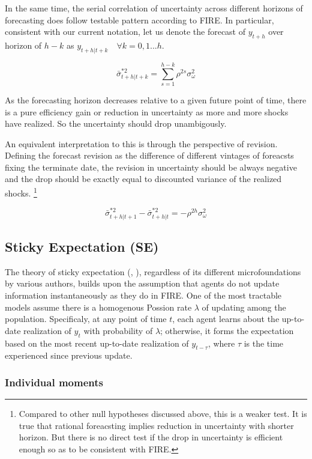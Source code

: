 \documentclass[]{article}
\begin{document}
In the same time, the serial correlation of uncertainty across different horizons of forecasting does follow testable pattern according to FIRE. In particular, consistent with our current notation, let us denote the forecast of $y_{t+h}$ over horizon of $h-k$ as $y_{t+h|t+k} \quad \forall k =0,1...h$. 

$$\bar \sigma^{*2}_{t+h|t+k} = \sum^{h-k}_{s=1}\rho^{2s} \sigma^2_{\omega}$$

As the forecasting horizon decreases relative to a given future point of time, there is a pure efficiency gain or reduction in uncertainty as more and more shocks have realized. So the uncertainty should drop unambigously. 

An equivalent interpretation to this is through the perspective of revision. Defining the forecast revision as the difference of different vintages of foreacsts fixing the terminate date, the revision in uncertainty should be always negative and the drop should be exactly equal to discounted variance of the realized shocks. \footnote{Compared to other null hypotheses discussed above, this is a weaker test. It is true that rational foreacsting implies reduction in uncertainty with shorter horizon. But there is no direct test if the drop in uncertainty is efficient enough so as to be consistent with FIRE. }

$$\bar \sigma^{*2}_{t+h|t+1} - \bar \sigma^{*2}_{t+h|t} = - \rho^{2h}\sigma^2_\omega$$


\subsection{Sticky Expectation (SE)}

The theory of sticky expectation (\cite{xx}, \cite{xx} ), regardless of its different microfoundations by various authors, builds upon the assumption that agents do not update information instantaneously as they do in FIRE. One of the most tractable models assume there is a homogenous Possion rate $\lambda$ of updating among the population. Specificaly, at any point of time $t$, each agent learns about the up-to-date realization of $y_t$ with probability of $\lambda$; otherwise, it forms the expectation based on the most recent up-to-date realization of $y_{t-\tau}$, where $\tau$ is the time experienced since previous update. 




\subsubsection{Individual moments} 
\end{document}
